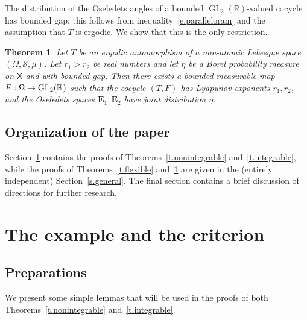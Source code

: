 \documentclass[10pt]{amsart}
\newtheorem{theo}{Theorem}[section]
\theoremstyle{definition}\newtheorem{defi}[theo]{Definition}\newtheorem{rema}[theo]{Remark}\newtheorem{exam}[theo]{Example}\newtheorem{exem}[theo]{Example}\newtheorem{nota}[theo]{Notation}
\newcommand{\R}{\mathbb{R}}
\newcommand{\E}{\mathbf{E}}
\newcommand{\sfX}{\mathsf{X}}
\newcommand{\clS}{\mathcal{S}}
\DeclareMathOperator{\GL}{GL}
\renewcommand*{\to}{\mathchoice{\longrightarrow}{\rightarrow}{\rightarrow}{\rightarrow}}
\begin{document}
The distribution of the Oseledets angles of a bounded $\GL_2(\R)$-valued cocycle has bounded gap: this follows from inequality~\eqref{e.paralleloram} and the assumption that $T$ is ergodic. We show that this is the only restriction.


\begin{theo}\label{t.boundedflexible}
Let $T$ be an ergodic automorphism of a non-atomic Lebesgue space $(\Omega,\clS,\mu)$. Let $r_1 > r_2$ be real numbers and let $\eta$ be a Borel probability measure on $\sfX$ and with bounded gap. Then there exists a bounded measurable map ${F:\Omega \to \GL_2(\R)}$ such that the cocycle $(T,F)$ has Lyapunov exponents $r_1,r_2$, and the Oseledets spaces $\E_1,\E_2$ have joint distribution $\eta$.
\end{theo}


\subsection{Organization of the paper}

Section~\ref{s.iid} contains the proofs of Theorems~\ref{t.nonintegrable} and~\ref{t.integrable}, while the proofs of Theorems~\ref{t.flexible} and~\ref{t.boundedflexible} are given in the (entirely independent) Section~\ref{s.general}. The final section contains a brief discussion of directions for further research.



\section{The example and the criterion}\label{s.iid}

\subsection{Preparations}

We present some simple lemmas that will be used in the proofs of both Theorems~\ref{t.nonintegrable} and~\ref{t.integrable}.
\end{document}

